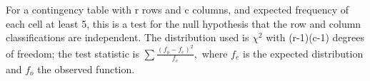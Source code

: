  For a contingency table with r rows and c columns, and expected
frequency of each cell at least 5, this is a
test for the null hypothesis that the row and column classifications
are independent. The distribution used is
$ \chi ^2 $ with (r-1)(c-1) degrees of freedom;
the test statistic is $ \sum \frac{(f_o - f_e ) ^2 } {f_e} , $
where $f_{e}$  is the expected distribution and $f_{o}$  the observed function.

